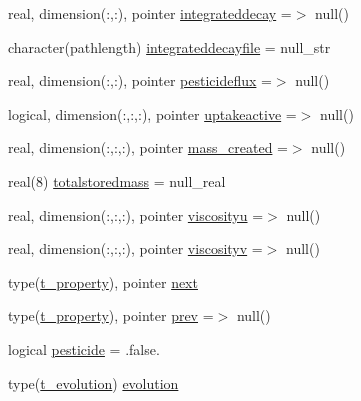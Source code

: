 \begin{DoxyCompactItemize}
real, dimension(\+:,\+:), pointer \mbox{\hyperlink{structmoduleporousmediaproperties_1_1t__property_a6c2c4e573e968aafc18bb12e45c887f8}{integrateddecay}} =$>$ null()
\item 
character(pathlength) \mbox{\hyperlink{structmoduleporousmediaproperties_1_1t__property_a6a92d5eed7afb5bcf9c22e0962407223}{integrateddecayfile}} = null\+\_\+str
\item 
real, dimension(\+:,\+:), pointer \mbox{\hyperlink{structmoduleporousmediaproperties_1_1t__property_a12f61bbf3466c0d0928699aa8331ad91}{pesticideflux}} =$>$ null()
\item 
logical, dimension(\+:,\+:,\+:), pointer \mbox{\hyperlink{structmoduleporousmediaproperties_1_1t__property_a8a1ff05be79de1aec9b2e61ee36a1d02}{uptakeactive}} =$>$ null()
\item 
real, dimension(\+:,\+:,\+:), pointer \mbox{\hyperlink{structmoduleporousmediaproperties_1_1t__property_abf95506446f736e5488c62f14c63ef72}{mass\+\_\+created}} =$>$ null()
\item 
real(8) \mbox{\hyperlink{structmoduleporousmediaproperties_1_1t__property_a05a1aa16f77afa518efb1a068eed0ec1}{totalstoredmass}} = null\+\_\+real
\item 
real, dimension(\+:,\+:,\+:), pointer \mbox{\hyperlink{structmoduleporousmediaproperties_1_1t__property_a061ffe9e369e7cdb8af384f259aa1d4d}{viscosityu}} =$>$ null()
\item 
real, dimension(\+:,\+:,\+:), pointer \mbox{\hyperlink{structmoduleporousmediaproperties_1_1t__property_a4c169f67509343978c53c8feaa6b6c61}{viscosityv}} =$>$ null()
\item 
type(\mbox{\hyperlink{structmoduleporousmediaproperties_1_1t__property}{t\+\_\+property}}), pointer \mbox{\hyperlink{structmoduleporousmediaproperties_1_1t__property_aa5f725052fd68492cc374238cebdb937}{next}}
\item 
type(\mbox{\hyperlink{structmoduleporousmediaproperties_1_1t__property}{t\+\_\+property}}), pointer \mbox{\hyperlink{structmoduleporousmediaproperties_1_1t__property_afd6f099038b1cc03fe6ee88136647b12}{prev}} =$>$ null()
\item 
logical \mbox{\hyperlink{structmoduleporousmediaproperties_1_1t__property_a9f8e57f7bc302bb3f1a0d6a1692180cb}{pesticide}} = .false.
\item 
type(\mbox{\hyperlink{structmoduleporousmediaproperties_1_1t__evolution}{t\+\_\+evolution}}) \mbox{\hyperlink{structmoduleporousmediaproperties_1_1t__property_a2e8fac411d7d705740944bd96bbb5a97}{evolution}}
\item 

\end{DoxyCompactItemize}
